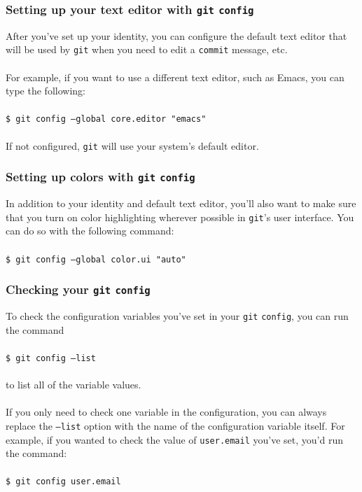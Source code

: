 \documentclass{beamer}
\begin{document}
\begin{frame}
   \frametitle{Setting up your text editor with \texttt{git} \texttt{config}}
   After you've set up your identity, you can configure the default text 
   editor that will be used by \texttt{git} when you need to edit a 
   \texttt{commit} message, etc.
   \\ \ \\
   For example, if you want to use a different text editor, such as 
   Emacs, you can type the following:
   \\ \ \\
   \texttt{\hspace{1.0em}\$ git config --global core.editor "emacs"}
   \\ \ \\
   If not configured, \texttt{git} will use your system's default editor.
\end{frame}

\begin{frame}
   \frametitle{Setting up colors with \texttt{git} \texttt{config}}
   In addition to your identity and default text editor, you'll also 
   want to make sure that you turn on color highlighting wherever 
   possible in \texttt{git}'s user interface. You can do so with the 
   following command:
   \\ \ \\
   \texttt{\hspace{1.0em}\$ git config --global color.ui "auto"}
\end{frame}

\begin{frame}
   \frametitle{Checking your \texttt{git} \texttt{config}}
   To check the configuration variables you've set in your 
   \texttt{git} \texttt{config}, you can run the command
   \\ \ \\
   \texttt{\hspace{1.0em}\$ git config --list}
   \\ \ \\
   to list all of the variable values. 
   \\ \ \\
   If you only need to check one variable in the configuration, you can
   always replace the \texttt{--list} option with the name of the 
   configuration variable itself. For example, if you wanted to check 
   the value of \texttt{user.email} you've set, you'd run the command:
   \\ \ \\
   \texttt{\hspace{1.0em}\$ git config user.email}
\end{frame}
\end{document}
